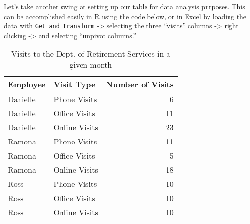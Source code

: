 \documentclass[]{book}
\newenvironment{Shaded}{\begin{snugshade}}{\end{snugshade}}
\newcommand{\KeywordTok}[1]{\textcolor[rgb]{0.13,0.29,0.53}{\textbf{#1}}}
\newcommand{\DataTypeTok}[1]{\textcolor[rgb]{0.13,0.29,0.53}{#1}}
\newcommand{\StringTok}[1]{\textcolor[rgb]{0.31,0.60,0.02}{#1}}
\newcommand{\CommentTok}[1]{\textcolor[rgb]{0.56,0.35,0.01}{\textit{#1}}}
\newcommand{\OperatorTok}[1]{\textcolor[rgb]{0.81,0.36,0.00}{\textbf{#1}}}
\newcommand{\NormalTok}[1]{#1}
\begin{document}
Let's take another swing at setting up our table for data analysis
purposes. This can be accomplished easily in R using the code below, or
in Excel by loading the data with \texttt{Get\ and\ Transform}
-\textgreater{} selecting the three ``visits'' columns -\textgreater{}
right clicking -\textgreater{} and selecting ``unpivot columns.''

\begin{Shaded}
\end{Shaded}

\begin{table}

\caption{\label{tab:unnamed-chunk-3}Visits to the Dept. of Retirement Services in a given month}
\centering
\begin{tabular}[t]{l|l|r}
\hline
Employee & Visit Type & Number of Visits\\
\hline
Danielle & Phone Visits & 6\\
\hline
Danielle & Office Visits & 11\\
\hline
Danielle & Online Visits & 23\\
\hline
Ramona & Phone Visits & 11\\
\hline
Ramona & Office Visits & 5\\
\hline
Ramona & Online Visits & 18\\
\hline
Ross & Phone Visits & 10\\
\hline
Ross & Office Visits & 10\\
\hline
Ross & Online Visits & 10\\
\hline
\end{tabular}
\end{table}
\end{document}
